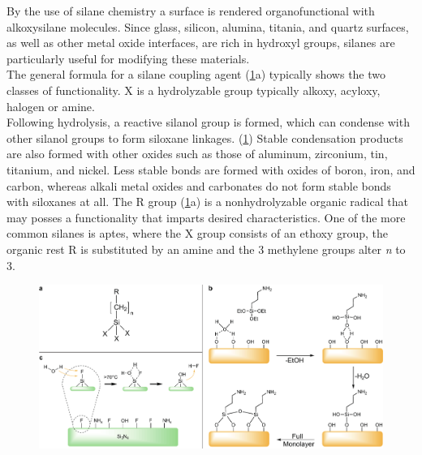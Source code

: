 By the use of silane chemistry a surface is rendered organofunctional with alkoxysilane molecules. Since glass, silicon, alumina, titania, and quartz surfaces, as well as other metal oxide interfaces, are rich in hydroxyl groups, silanes are particularly useful for modifying these materials.\cite{lit:chem:silanizingGlass}\\The general formula for a silane coupling agent (\cref{fig:chem:APTES}a) typically shows the two classes of functionality. X is a hydrolyzable group typically alkoxy, acyloxy, halogen or amine.
\\
Following hydrolysis, a reactive \gls{silanol} group is formed, which can condense with other silanol groups to form \gls{siloxane} linkages. 
(\cref{fig:chem:APTES}) Stable condensation products are also formed with other oxides such as those of aluminum, zirconium, tin, titanium, and nickel. Less stable bonds are formed with oxides of boron, iron, and carbon, whereas alkali metal oxides and carbonates do not form stable bonds with \glspl{siloxane} at all. The R group (\cref{fig:chem:APTES}a) is a nonhydrolyzable organic radical that may posses a functionality that imparts desired characteristics. One of the more common silanes is \gls{aptes}, where the X group consists of an \gls{ethoxy} group, the organic rest R is substituted by an \gls{amine} and the 3 \gls{methylene} groups alter \textit{n} to 3.\cite{lit:chem:GELEST} 
\begin{figure}[h]
	\centering
	\includegraphics[width=\linewidth]{./Ressources/Chemistry/SiN-APTES-Silane.pdf}
	\label{fig:chem:APTES}
\end{figure}

